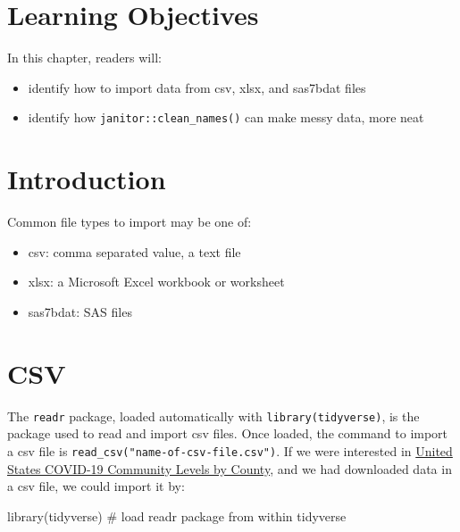 \documentclass[
  letterpaper,
  DIV=11,
  numbers=noendperiod]{scrreprt}
\newenvironment{Shaded}{\begin{snugshade}}{\end{snugshade}}
\newcommand{\CommentTok}[1]{\textcolor[rgb]{0.37,0.37,0.37}{#1}}
\newcommand{\FunctionTok}[1]{\textcolor[rgb]{0.28,0.35,0.67}{#1}}
\newcommand{\NormalTok}[1]{\textcolor[rgb]{0.00,0.23,0.31}{#1}}
\providecommand{\tightlist}{%
  \setlength{\itemsep}{0pt}\setlength{\parskip}{0pt}}\usepackage{longtable,booktabs,array}
\begin{document}
\hypertarget{learning-objectives-4}{%
\section{Learning Objectives}\label{learning-objectives-4}}

In this chapter, readers will:

\begin{itemize}
\tightlist
\item
  identify how to import data from csv, xlsx, and sas7bdat files
\item
  identify how \texttt{janitor::clean\_names()} can make messy data,
  more neat
\end{itemize}

\hypertarget{introduction-4}{%
\section{Introduction}\label{introduction-4}}

Common file types to import may be one of:

\begin{itemize}
\tightlist
\item
  csv: comma separated value, a text file
\item
  xlsx: a Microsoft Excel workbook or worksheet
\item
  sas7bdat: SAS files
\end{itemize}

\hypertarget{csv}{%
\section{CSV}\label{csv}}

The \texttt{readr} package, loaded automatically with
\texttt{library(tidyverse)}, is the package used to read and import csv
files. Once loaded, the command to import a csv file is
\texttt{read\_csv("name-of-csv-file.csv")}. If we were interested in
\href{https://data.cdc.gov/Public-Health-Surveillance/United-States-COVID-19-Community-Levels-by-County/3nnm-4jni/data}{United
States COVID-19 Community Levels by County}, and we had downloaded data
in a csv file, we could import it by:

\begin{Shaded}
\begin{Highlighting}[]
\FunctionTok{library}\NormalTok{(tidyverse) }\CommentTok{\# load readr package from within tidyverse}
\end{Highlighting}
\end{Shaded}
\end{document}
